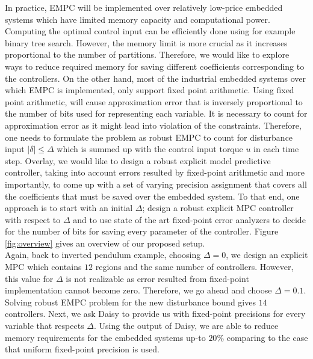 	In practice, EMPC will be implemented over relatively low-price embedded systems which have limited memory capacity and computational power. Computing the optimal control input can be efficiently done using for example binary tree search. However, the memory limit is more crucial as it increases proportional to the number of partitions.	Therefore, we would like to explore ways to reduce required memory for saving different coefficients corresponding to the controllers.
	On the other hand, most of the industrial embedded systems over which EMPC is implemented, only support fixed point arithmetic. Using fixed point arithmetic, will cause approximation error that is inversely proportional to the number of bits used for representing each variable. It is necessary to count for approximation error as it might lead into violation of the constraints. Therefore, one needs to formulate the problem as robust EMPC to count for disturbance input $|\delta|\leq \Delta$ which is summed up with the control input torque $u$ in each time step. %
	Overlay, we would like to design a robust explicit model predictive controller, taking into account errors resulted by fixed-point arithmetic and more importantly, to come up with a set of varying precision assignment that covers all the coefficients that must be saved over the embedded system. To that end, one approach is to start with an initial $\Delta$; design a robust explicit MPC controller with respect to $\Delta$ and to use state of the art fixed-point error analyzers to decide for the number of bits for saving every parameter of the controller. Figure \ref{fig:overview} gives an overview of our proposed setup.\\
	Again, back to inverted pendulum example, choosing $\Delta=0$, we design an explicit MPC which contains $12$ regions and the same number of controllers. However, this value for $\Delta$ is not realizable as error resulted from fixed-point implementation cannot become zero. Therefore, we go ahead and choose $\Delta=0.1$. Solving robust EMPC problem for the new disturbance bound gives $14$ controllers. Next, we ask Daisy to provide us with fixed-point precisions for every variable that respects $\Delta$. Using the output of Daisy, we are able to reduce memory requirements for the embedded systems up-to $20\%$ comparing to the case that uniform fixed-point precision is used.
	
